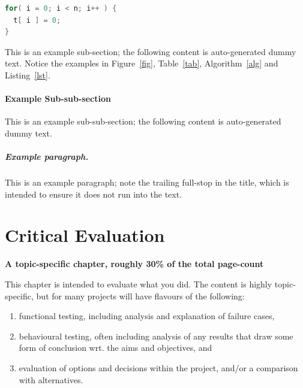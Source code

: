 \documentclass[ %
                    author={Daniel Page},
                supervisor={Dr. Andrew Calway},
                    degree={MSc},
                     title={Some Structural Guidelines for Data Science MSc Theses, Including Those With Long Titles that Run Across Multiple Lines on the Front Page},
                  subtitle={And those including an optional subtitle too, for good measure},
                      type={},
                      year={2021}]{dissertation}
\begin{document}
\begin{algorithm}[t]
\caption{This is an example algorithm.}
\label{alg}
\end{algorithm}

\begin{lstlisting}[float={t},caption={This is an example listing.},label={lst},language=C]
for( i = 0; i < n; i++ ) {
  t[ i ] = 0;
}
\end{lstlisting}

This is an example sub-section;
the following content is auto-generated dummy text.
Notice the examples in Figure~\ref{fig}, Table~\ref{tab}, Algorithm~\ref{alg}
and Listing~\ref{lst}.
\lipsum

\subsubsection{Example Sub-sub-section}

This is an example sub-sub-section;
the following content is auto-generated dummy text.
\lipsum

\paragraph{Example paragraph.}

This is an example paragraph; note the trailing full-stop in the title,
which is intended to ensure it does not run into the text.


\chapter{Critical Evaluation}
\label{chap:evaluation}

{\bf A topic-specific chapter, roughly 30\% of the total page-count} 
\vspace{1cm} 

\noindent
This chapter is intended to evaluate what you did.  The content is highly 
topic-specific, but for many projects will have flavours of the following:

\begin{enumerate}
\item functional  testing, including analysis and explanation of failure 
      cases,
\item behavioural testing, often including analysis of any results that 
      draw some form of conclusion wrt. the aims and objectives,
      and
\item evaluation of options and decisions within the project, and/or a
      comparison with alternatives.
\end{enumerate}
\end{document}
